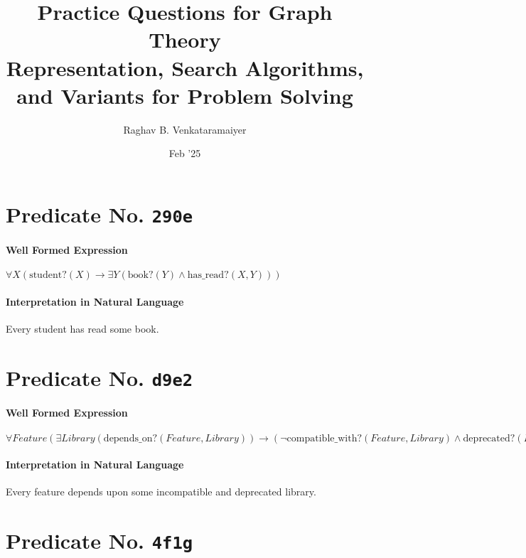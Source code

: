 \documentclass[11pt]{article}
\author{Raghav B. Venkataramaiyer}
\date{Feb '25}
\title{Practice Questions for Graph Theory\\\medskip
\large Representation, Search Algorithms, and Variants for Problem Solving}
\begin{document}
\maketitle

\section{Predicate No. \texttt{290e}}
\label{sec:orgc0b116c}

\paragraph*{Well Formed Expression}
\label{sec:orga8dcfc7}

\(\forall X (\text{student?}(X) \rightarrow \exists Y (\text{book?}(Y) \land \text{has\_read?}(X, Y)))\)

\paragraph*{Interpretation in Natural Language}
\label{sec:org9cac9d1}

Every student has read some book.



\section{Predicate No. \texttt{d9e2}}
\label{sec:orgb1ae8ad}

\paragraph*{Well Formed Expression}
\label{sec:org0bc7920}

\(\forall \mathit{Feature} (\exists \mathit{Library} (\mathrm{depends\_on?}(\mathit{Feature}, \mathit{Library})) \rightarrow (\neg \mathrm{compatible\_with?}(\mathit{Feature}, \mathit{Library}) \land \mathrm{deprecated?}(\mathit{Library})))\)

\paragraph*{Interpretation in Natural Language}
\label{sec:org9fd2e9e}

Every feature depends upon some incompatible and deprecated library.



\section{Predicate No. \texttt{4f1g}}
\label{sec:org947336f}
\end{document}
